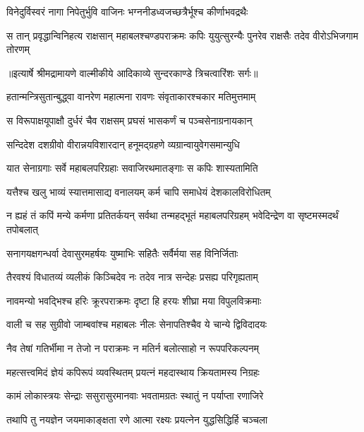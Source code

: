 \twolineshloka
{विनेदुर्विस्वरं नागा निपेतुर्भुवि वाजिनः}
{भग्ननीडध्वजच्छत्रैर्भूश्च कीर्णाभवद्रथैः} %

\fourlineindentedshloka
{स तान् प्रवृद्धान्विनिहत्य राक्षसान्}
{महाबलश्चण्डपराक्रमः कपिः}
{युयुत्सुरन्यैः पुनरेव राक्षसैः}
{तदेव वीरोऽभिजगाम तोरणम्} %


{॥इत्यार्षे श्रीमद्रामायणे वाल्मीकीये आदिकाव्ये सुन्दरकाण्डे त्रिचत्वारिंशः सर्गः॥}


\twolineshloka
{हतान्मन्त्रिसुतान्बुद्ध्वा वानरेण महात्मना}
{रावणः संवृताकारश्चकार मतिमुत्तमाम्} %

\twolineshloka
{स विरूपाक्षयूपाक्षौ दुर्धरं चैव राक्षसम्}
{प्रघसं भासकर्णं च पञ्चसेनाग्रनायकान्} %

\twolineshloka
{सन्दिदेश दशग्रीवो वीरान्नयविशारदान्}
{हनूमद्ग्रहणे व्यग्रान्वायुवेगसमान्युधि} %

\twolineshloka
{यात सेनाग्रगाः सर्वे महाबलपरिग्रहाः}
{सवाजिरथमातङ्गाः स कपिः शास्यतामिति} %

\twolineshloka
{यत्तैश्च खलु भाव्यं स्यात्तमासाद्य वनालयम्}
{कर्म चापि समाधेयं देशकालविरोधितम्} %

\threelineshloka
{न ह्यहं तं कपिं मन्ये कर्मणा प्रतितर्कयन्}
{सर्वथा तन्महद्भूतं महाबलपरिग्रहम्}
{भवेदिन्द्रेण वा सृष्टमस्मदर्थं तपोबलात्} %

\twolineshloka
{सनागयक्षगन्धर्वा देवासुरमहर्षयः}
{युष्माभिः सहितैः सर्वैर्मया सह विनिर्जिताः} %

\twolineshloka
{तैरवश्यं विधातव्यं व्यलीकं किञ्चिदेव नः}
{तदेव नात्र सन्देहः प्रसह्य परिगृह्यताम्} %

\twolineshloka
{नावमन्यो भवद्भिश्च हरिः क्रूरपराक्रमः}
{दृष्टा हि हरयः शीघ्रा मया विपुलविक्रमाः} %

\twolineshloka
{वाली च सह सुग्रीवो जाम्बवांश्च महाबलः}
{नीलः सेनापतिश्चैव ये चान्ये द्विविदादयः} %

\twolineshloka
{नैव तेषां गतिर्भीमा न तेजो न पराक्रमः}
{न मतिर्न बलोत्साहो न रूपपरिकल्पनम्} %

\twolineshloka
{महत्सत्त्वमिदं ज्ञेयं कपिरूपं व्यवस्थितम्}
{प्रयत्नं महदास्थाय क्रियतामस्य निग्रहः} %

\twolineshloka
{कामं लोकास्त्रयः सेन्द्राः ससुरासुरमानवाः}
{भवतामग्रतः स्थातुं न पर्याप्ता रणाजिरे} %

\twolineshloka
{तथापि तु नयज्ञेन जयमाकाङ्क्षता रणे}
{आत्मा रक्ष्यः प्रयत्नेन युद्धसिद्धिर्हि चञ्चला} %

